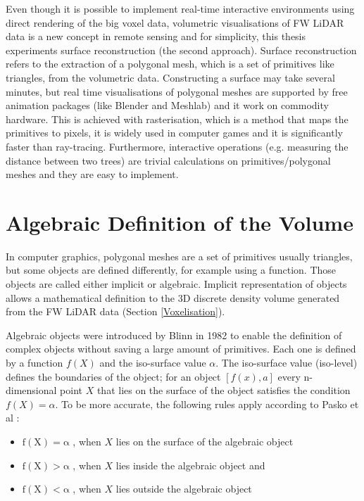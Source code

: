 \documentclass{subfiles}
\begin{document}
\par Even though it is possible to implement real-time interactive environments using direct rendering of the big voxel data, volumetric visualisations of FW LiDAR data is a new concept in remote sensing and for simplicity, this thesis experiments surface reconstruction (the second approach). Surface reconstruction refers to the extraction of a polygonal mesh, which is a set of primitives like triangles, from the volumetric data. Constructing a surface may take several minutes, but real time visualisations of polygonal meshes are supported by free animation packages (like Blender and Meshlab) and it work on commodity hardware. This is achieved with rasterisation, which is a method that maps the primitives to pixels, it is widely used in computer games and it is significantly faster than ray-tracing. Furthermore, interactive operations (e.g. measuring the distance between two trees) are trivial calculations on primitives/polygonal meshes and they are easy to implement. 



\section{Algebraic Definition of the Volume}\label{sec:AlgebracObjects}

In computer graphics, polygonal meshes are a set of primitives usually triangles, but some objects are defined differently, for example using a function. Those objects are called either implicit or algebraic. Implicit representation of objects allows a mathematical definition to the 3D discrete density volume generated from the FW LiDAR data (Section \ref{Voxelisation}). 

\par Algebraic objects were introduced by Blinn in 1982 \cite{Blinn1982} to enable the definition of complex objects without saving a large amount of primitives. Each one is defined by a function $ \mathit{f(X)} $ and the iso-surface value $\alpha$. The iso-surface value (iso-level) defines the boundaries of the object; for an object $ [f(x),a]$ every n-dimensional point $ \mathit{X} $  that lies on the surface of the object satisfies the condition $ \mathit{f(X)=\alpha }  $. To be more accurate, the following rules apply according to Pasko et al \cite{Pasko1994}: 
\begin{itemize}
	\item $	\mathrm{f(X) = \alpha }$ , when $X$ lies on the surface of the algebraic object
	\item $	\mathrm{f(X) > \alpha }$ , when $X$ lies inside the algebraic object and
	\item $	\mathrm{f(X) < \alpha }$ , when $X$ lies outside the algebraic object	 
\end{itemize}
\end{document}
